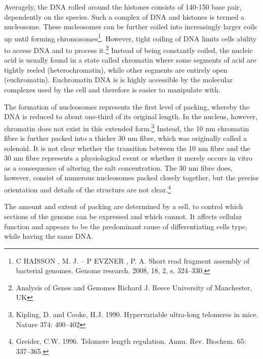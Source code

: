 Averagely, the DNA rolled around the histones consists of 140-150 base pair, dependently on the species. Such a complex of DNA and histones is termed a nucleosome. These nucleosomes can be further coiled into increasingly larger coils up until forming chromosomes\footnote{C HAISSON , M. J. – P EVZNER , P. A. Short read fragment assembly of bacterial genomes.
Genome research. 2008, 18, 2, s. 324–330.}. However, tight coiling of DNA limits cells ability to access DNA and to process it.\footnote{Analysis of Genes
and Genomes Richard J. Reece University of Manchester, UK} Instead of being constantly coiled, the nucleic acid is usually found in a state called chromatin where some segments of acid are tightly reeled (heterochromatin), while other segments are entirely open (euchromatin). Euchromatin DNA is is highly accessible by the molecular complexes used by the cell and therefore is easier to manipulate with. 

The formation of nucleosomes represents the first level of packing, whereby
the DNA is reduced to about one-third of its original length. In the nucleus,
however, chromatin does not exist in this extended form.\footnote{Kipling, D. and Cooke, H.J. 1990. Hypervariable ultra-long telomeres in
mice. Nature 374: 400–402} Instead, the 10
nm chromatin fibre is further packed into a thicker 30 nm fibre, which was
originally called a solenoid. It is not clear whether the transition between the
10 nm fibre and the 30 nm fibre represents a physiological event or whether it
merely occurs in vitro as a consequence of altering the salt concentration. The
30 nm fibre does, however, consist of numerous nucleosomes packed closely
together, but the precise orientation and details of the structure are not clear.\footnote{Greider, C.W. 1996. Telomere length regulation. Annu. Rev. Biochem.
65: 337–365.}

The amount and extent of packing are determined by a sell, to control which sections of the genome can be expressed and which cannot. It affects cellular function and appears to be the predominant cause of differentiating cells type, while having the same DNA.

